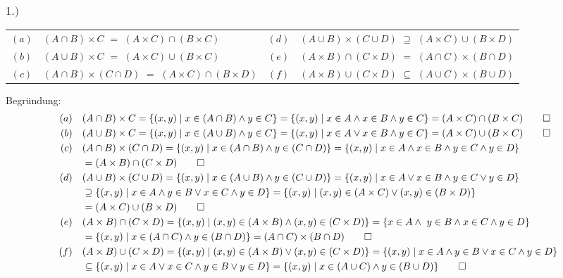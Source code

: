 \documentclass[titlepage]{article}
\newcommand{\1}{\mathbb{1}}
\newcommand{\0}{\mathbb{0}}
\begin{document}
		\subsubsection*{$1.)$}
			\begin{table}[h]
				\begin{tabular}{clcl}
					$(a)$&$(A\cap B)\times C$ $=$ $(A\times C)\cap(B\times C)$&
					$(d)$&$(A\cup B)\times(C\cup D)$ $\supseteq$ $(A\times C)\cup(B\times D)$\\
					$(b)$&$(A\cup B)\times C$ $=$ $(A\times C)\cup(B\times C)$&
					$(e)$&$(A\times B)\cap(C\times D)$ $=$ $(A\cap C)\times(B\cap D)$\\
					$(c)$&$(A\cap B)\times(C\cap D)$ $=$ $(A\times C)\cap(B\times D)$&
					$(f)$&$(A\times B)\cup(C\times D)$ $\subseteq$ $(A\cup C)\times(B\cup D)$
				\end{tabular}
			\end{table}
		Begründung:
			\begin{align*}
				(a)\quad&(A\cap B)\times C=\{(x,y)\mid x\in(A\cap B)\land y\in C\}=\{(x,y)\mid x\in A\land x\in B\land y\in C\}=(A\times C)\cap(B\times C)\qed
				\\
				(b)\quad&(A\cup B)\times C=\{(x,y)\mid x\in(A\cup B)\land y\in C\}=\{(x,y)\mid x\in A\lor x\in B\land y\in C\}=(A\times C)\cup(B\times C)\qed
				\\
				(c)\quad&(A\cap B)\times(C\cap D)=\{(x,y)\mid x\in (A\cap B)\land y\in(C\cap D)\}=\{(x,y)\mid x\in A\land x\in B\land y\in C\land y\in D\}\\&=(A\times B)\cap(C\times D)\qed
				\\
				(d)\quad&(A\cup B)\times(C\cup D)=\{(x,y)\mid x\in(A\cup B)\land y\in (C\cup D)\}=\{(x,y)\mid x\in A\lor x\in B\land y\in C\lor y\in D\}\\&\supseteq\{(x,y)\mid x\in A\land y\in B\lor x\in C\land y\in D\}=\{(x,y)\mid (x,y)\in(A\times C)\lor(x,y)\in(B\times D)\}\\&=(A\times C)\cup(B\times D)\qed
				\\
				(e)\quad&(A\times B)\cap(C\times D)=\{(x,y)\mid (x,y)\in(A\times B)\land(x,y)\in(C\times D)\}=\{x\in A\land\ y\in B\land x\in C\land y\in D\}\\&=\{(x,y)\mid x\in(A\cap C)\land y\in(B\cap D)\}=(A\cap C)\times(B\cap D)\qed
				\\
				(f)\quad&(A\times B)\cup(C\times D)=\{(x,y)\mid(x,y)\in(A\times B)\lor(x,y)\in(C\times D)\}=\{(x,y)\mid x\in A\land y\in B\lor x\in C\land y\in D\}\\&\subseteq\{(x,y)\mid x\in A\lor x\in C\land y\in B\lor y\in D\}=\{(x,y)\mid x\in(A\cup C)\land y\in(B\cup D)\}\qed
			\end{align*}
		
\end{document}
